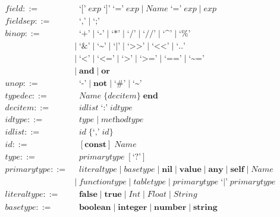 \begin{align*}
\textit{field} ::= & \;\; \texttt{`['} \; \textit{exp} \; \texttt{`]'} \; \texttt{`='} \; \textit{exp} \; | \;
  \textit{Name} \; \texttt{`='} \; \textit{exp} \; | \;
  \textit{exp}\\
\textit{fieldsep} ::= & \;\; \texttt{`,'} \; | \; \texttt{`;'}\\
\textit{binop} ::= & \;\; \texttt{`+'} \; | \; \texttt{`-'} \; | \; \texttt{`*'} \; | \; \texttt{`/'} \; | \;
  \texttt{`//'} \; | \; \texttt{`\textasciicircum'} \; | \; \texttt{`\%'}\\
& | \; \texttt{`\&'} \; | \; \texttt{`\textasciitilde'} \; | \; \texttt{`|'} \; | \;
  \texttt{`>>'} \; | \; \texttt{`<<'} \; | \; \texttt{`..'}\\
& | \; \texttt{`<'} \; | \; \texttt{`<='} \; | \; \texttt{`>'} \; | \; \texttt{`>='} \; | \;
  \texttt{`=='} \; | \; \texttt{`\textasciitilde='}\\
& | \; \textbf{and} \; | \; \textbf{or}\\
\textit{unop} ::= & \;\; \texttt{`-'} \; | \; \textbf{not} \; | \; \texttt{`\#'} \; | \; \texttt{`\textasciitilde'}\\
\textit{typedec} ::= & \;\; \textit{Name} \; \{\textit{decitem}\} \; \textbf{end}\\
\textit{decitem} ::= & \;\; \textit{idlist} \; \texttt{`:'} \; \textit{idtype}\\
\textit{idtype} ::= & \;\; \textit{type} \; | \; \textit{methodtype}\\
\textit{idlist} ::= & \;\; \textit{id} \; \{\texttt{`,'} \; \textit{id}\}\\
\textit{id} ::= & \;\; [\textbf{const}] \; \textit{Name}\\
\textit{type} ::= & \;\; \textit{primarytype} \; [\texttt{`?'}]\\
\textit{primarytype} ::= & \;\; \textit{literaltype} \; | \;
  \textit{basetype} \; | \;
  \textbf{nil} \; | \;
  \textbf{value} \; | \;
  \textbf{any} \; | \;
  \textbf{self} \; | \;
  \textit{Name}\\
& | \; \textit{functiontype} \; | \;
  \textit{tabletype} \; | \;
  \textit{primarytype} \; \texttt{`|'} \; \textit{primarytype}\\
\textit{literaltype} ::= & \;\; \textbf{false} \; | \;
  \textbf{true} \; | \;
  \textit{Int} \; | \;
  \textit{Float} \; | \;
  \textit{String}\\
\textit{basetype} ::= & \;\; \textbf{boolean} \; | \;
  \textbf{integer} \; | \;
  \textbf{number} \; | \;
  \textbf{string}\\

\end{align*}
